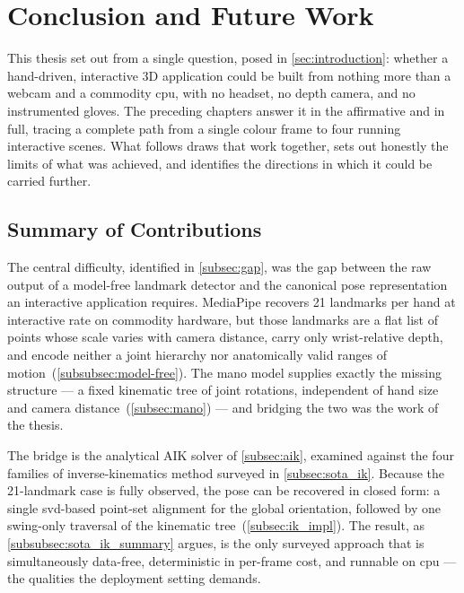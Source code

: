 
\section{Conclusion and Future Work}\label{sec:conclusion}

This thesis set out from a single question, posed in \autoref{sec:introduction}:
whether a hand-driven, interactive 3D application could be built from nothing more
than a webcam and a commodity \acrshort{cpu}, with no headset, no depth camera, and
no instrumented gloves. The preceding chapters answer it in the affirmative and in
full, tracing a complete path from a single colour frame to four running interactive
scenes. What follows draws that work together, sets out honestly the limits of what
was achieved, and identifies the directions in which it could be carried further.

\subsection{Summary of Contributions}\label{subsec:conclusion_summary}

The central difficulty, identified in \autoref{subsec:gap}, was the gap between the
raw output of a model-free landmark detector and the canonical pose representation an
interactive application requires. MediaPipe \cite{zhang2020mediapipehands} recovers
21 landmarks per hand at interactive rate on commodity hardware, but those landmarks
are a flat list of points whose scale varies with camera distance, carry only
wrist-relative depth, and encode neither a joint hierarchy nor anatomically valid
ranges of motion~(\autoref{subsubsec:model-free}). The \acrshort{mano} model
\cite{MANO:SIGGRAPHASIA:2017} supplies exactly the missing structure --- a fixed
kinematic tree of joint rotations, independent of hand size and camera
distance~(\autoref{subsec:mano}) --- and bridging the two was the work of the thesis.

The bridge is the analytical AIK solver of \autoref{subsec:aik}, examined against the
four families of inverse-kinematics method surveyed in \autoref{subsec:sota_ik}.
Because the 21-landmark case is fully observed, the pose can be recovered in closed
form: a single \acrshort{svd}-based point-set alignment for the global orientation,
followed by one swing-only traversal of the kinematic tree~(\autoref{subsec:ik_impl}).
The result, as \autoref{subsubsec:sota_ik_summary} argues, is the only surveyed
approach that is simultaneously data-free, deterministic in per-frame cost, and
runnable on \acrshort{cpu} --- the qualities the deployment setting demands.

